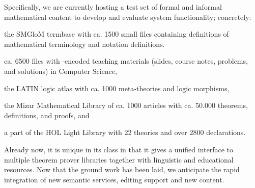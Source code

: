 Specifically, we are currently hosting a test set of formal and informal
 mathematical content to develop and evaluate system functionality; concretely:
 \begin{inparaenum}[\em i\rm)]
 \item the SMGloM termbase with ca. 1500 small \sTeX files containing definitions of
   mathematical terminology and notation definitions.
 \item ca. 6500 files with \sTeX-encoded teaching materials (slides, course notes,
   problems, and solutions) in Computer Science,
 \item the LATIN logic atlas with ca. 1000 meta-theories and logic morphisms, 
 \item the Mizar Mathematical Library of ca. 1000 articles with ca. 50.000 theorems,
   definitions, and proofs, and
 \item a part of the HOL Light Library with 22 theories and over 2800 declarations.
 \end{inparaenum}
 Already now, it is unique in its class in that it gives a unified interface to multiple
 theorem prover libraries together with linguistic and educational resources. Now that the
 ground work has been laid, we anticipate the rapid integration of new semantic services,
 editing support and new content.


